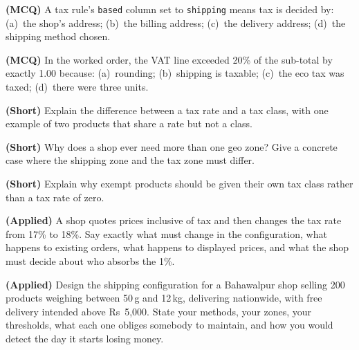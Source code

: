 \begin{reviewq}
  \item \textbf{(MCQ)} A tax rule's \texttt{based} column set to
        \texttt{shipping} means tax is decided by: (a)~the shop's address;
        (b)~the billing address; (c)~the delivery address; (d)~the shipping
        method chosen.
  \item \textbf{(MCQ)} In the worked order, the VAT line exceeded 20\% of the
        sub-total by exactly 1.00 because: (a)~rounding; (b)~shipping is
        taxable; (c)~the eco tax was taxed; (d)~there were three units.
  \item \textbf{(Short)} Explain the difference between a tax rate and a tax
        class, with one example of two products that share a rate but not a
        class.
  \item \textbf{(Short)} Why does a shop ever need more than one geo zone? Give
        a concrete case where the shipping zone and the tax zone must differ.
  \item \textbf{(Short)} Explain why exempt products should be given their own
        tax class rather than a tax rate of zero.
  \item \textbf{(Applied)} A shop quotes prices inclusive of tax and then
        changes the tax rate from 17\% to 18\%. Say exactly what must change in
        the configuration, what happens to existing orders, what happens to
        displayed prices, and what the shop must decide about who absorbs the
        1\%.
  \item \textbf{(Applied)} Design the shipping configuration for a Bahawalpur
        shop selling 200 products weighing between 50\,g and 12\,kg, delivering
        nationwide, with free delivery intended above Rs~5{,}000. State your
        methods, your zones, your thresholds, what each one obliges somebody to
        maintain, and how you would detect the day it starts losing money.
\end{reviewq}
